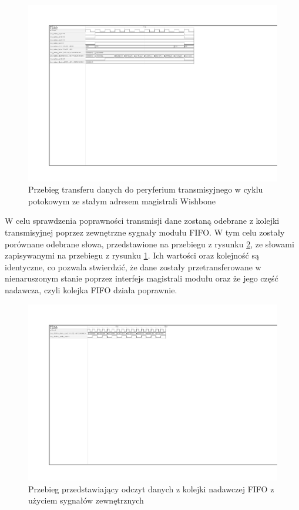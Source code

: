 \begin{figure}[H]
	\centering
	\includegraphics[scale=1,trim={2.54cm 14cm 11.1cm 2.9cm},clip]{testing/test-fifo-constant-8.pdf}
	\caption{Przebieg transferu danych do peryferium transmisyjnego w cyklu potokowym ze stałym adresem magistrali Wishbone}
	\label{fig:test-fifo-constant-8}
\end{figure}

W celu sprawdzenia poprawności transmisji dane zostaną odebrane z kolejki transmisyjnej poprzez zewnętrzne sygnały modułu FIFO. W tym celu zostały porównane odebrane słowa, przedstawione na przebiegu z rysunku \ref{fig:test-fifo-valid-8}, ze słowami zapisywanymi na przebiegu z rysunku \ref{fig:test-fifo-constant-8}. Ich wartości oraz kolejność są identyczne, co pozwala stwierdzić, że dane zostały przetransferowane w nienaruszonym stanie poprzez interfejs magistrali modułu oraz że jego część nadawcza, czyli kolejka FIFO działa poprawnie.

\begin{figure}[H]
	\centering
	\includegraphics[scale=1,trim={2.54cm 17cm 13.3cm 2.9cm},clip]{testing/test-fifo-valid-8.pdf}
	\caption{Przebieg przedstawiający odczyt danych z kolejki nadawczej FIFO z użyciem sygnałów zewnętrznych}
	\label{fig:test-fifo-valid-8}
\end{figure}

